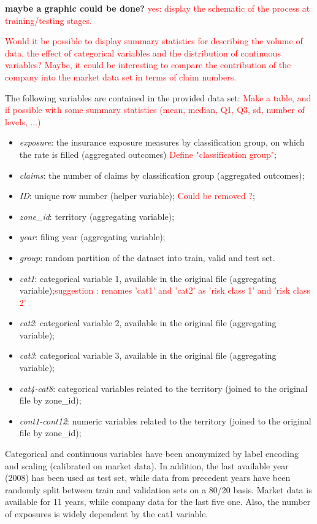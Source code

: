 \documentclass[
]{article}
\providecommand{\tightlist}{%
  \setlength{\itemsep}{0pt}\setlength{\parskip}{0pt}}
\begin{document}
\textbf{maybe a graphic could be done?}
\textcolor{red}{yes: display the schematic of the process at training/testing stages.}

\textcolor{red}{Would it be possible to display summary statistics for describing the volume of data, the effect of categorical variables and the distribution of continuous variables? Maybe, it could be interesting to compare the contribution of the company into the market data set in terms of claim numbers.}

The following variables are contained in the provided data set:
\textcolor{red}{Make a table, and if possible with some summary statistics (mean, median, Q1, Q3, sd, number of levels, ...)}

\begin{itemize}
\tightlist
\item
  \emph{exposure}: the insurance exposure measures by classification
  group, on which the rate is filled (aggregated outcomes)
  \textcolor{red}{Define "classification group"};
\item
  \emph{claims}: the number of claims by classification group
  (aggregated outcomes);
\item
  \emph{ID}: unique row number (helper variable);
  \textcolor{red}{Could be removed ?};
\item
  \emph{zone\_id}: territory (aggregating variable);
\item
  \emph{year}: filing year (aggregating variable);
\item
  \emph{group}: random partition of the dataset into train, valid and
  test set.
\item
  \emph{cat1}: categorical variable 1, available in the original file
  (aggregating
  variable);\textcolor{red}{suggestion : renames 'cat1' and 'cat2' as 'risk class 1' and 'risk class 2'}
\item
  \emph{cat2}: categorical variable 2, available in the original file
  (aggregating variable);
\item
  \emph{cat3}: categorical variable 3, available in the original file
  (aggregating variable);
\item
  \emph{cat4-cat8}: categorical variables related to the territory
  (joined to the original file by zone\_id);
\item
  \emph{cont1-cont12}: numeric variables related to the territory
  (joined to the original file by zone\_id);
\end{itemize}

Categorical and continuous variables have been anonymized by label
encoding and scaling (calibrated on market data). In addition, the last
available year (2008) has been used as test set, while data from
precedent years have been randomly split between train and validation
sets on a 80/20 basis. Market data is available for 11 years, while
company data for the last five one. Also, the number of exposures is
widely dependent by the cat1 variable.
\end{document}
